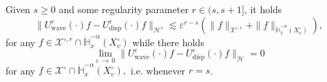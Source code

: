 \documentclass[AHL,Unicode,longabstracts,published]{cedram}
\newcommand{\Wave}{\mathrm{wave}}
\newcommand{\disp}{\mathrm{disp}}
\newcommand{\bbH}{\mathbb{H}}
\newcommand{\XX}{\mathcal{X}}
\newcommand{\HHH}{\mathscr{H}}
\newcommand{\SSSs}{\HHH}
\newcommand{\rSSSs}[1]{\HHH^{#1}}
\newcommand{\Slm}{X^{\circ}}
\newcommand{\SSlm}{\XX^{\circ}}
\newcommand{\rSSlm}[1]{\XX^{{\circ}, #1}}
\renewcommand*\ge{\geqslant}
\newcommand*\eps{{\varepsilon}}
\begin{document}
\begin{lemm}\label{lem:asymptotic_equiv_oscillating_semigroup}
Given $s \ge0$ and some regularity parameter $r \in (s, s+1]$, it holds
\begin{equation}\label{eq:asymptotic_equiv_oscillating_reg}
\| U^\eps_\Wave(\cdot) f - U^\eps_\disp(\cdot) f \|_{\rSSSs{s}} \lesssim \eps^{r-s} \left(\| f \|_{\rSSlm{r}} + \| f \|_{\dot{\bbH}^{-\alpha}_x (\Slm_v) } \right),
\end{equation}
for any $f \in \rSSlm{r} \cap \dot{\bbH}_x^{-\alpha}(\Slm_v)$ while there holds
\begin{equation}\label{eq:asymptotic_equiv_oscillating_general}
\lim_{\eps\,\to\,0}\| U^\eps_\Wave(\cdot) f - U^\eps_\disp(\cdot) f \|_{\SSSs} =0
\end{equation}
for any $f \in \SSlm \cap \dot{\bbH}^{-\alpha}_x (\Slm_v),$ i.e. whenever $r=s$.
\end{lemm}
\end{document}
